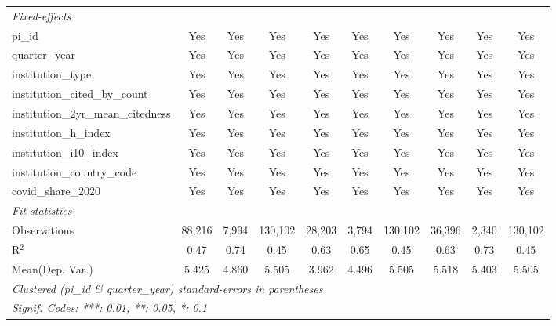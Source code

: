 \begin{tabular}{lccccccccc}
   \midrule
   \emph{Fixed-effects}\\
   pi\_id                                                      & Yes            & Yes             & Yes            & Yes           & Yes           & Yes            & Yes           & Yes             & Yes\\  
   quarter\_year                                               & Yes            & Yes             & Yes            & Yes           & Yes           & Yes            & Yes           & Yes             & Yes\\  
   institution\_type                                           & Yes            & Yes             & Yes            & Yes           & Yes           & Yes            & Yes           & Yes             & Yes\\  
   institution\_cited\_by\_count                               & Yes            & Yes             & Yes            & Yes           & Yes           & Yes            & Yes           & Yes             & Yes\\  
   institution\_2yr\_mean\_citedness                           & Yes            & Yes             & Yes            & Yes           & Yes           & Yes            & Yes           & Yes             & Yes\\  
   institution\_h\_index                                       & Yes            & Yes             & Yes            & Yes           & Yes           & Yes            & Yes           & Yes             & Yes\\  
   institution\_i10\_index                                     & Yes            & Yes             & Yes            & Yes           & Yes           & Yes            & Yes           & Yes             & Yes\\  
   institution\_country\_code                                  & Yes            & Yes             & Yes            & Yes           & Yes           & Yes            & Yes           & Yes             & Yes\\  
   covid\_share\_2020                                          & Yes            & Yes             & Yes            & Yes           & Yes           & Yes            & Yes           & Yes             & Yes\\  
   \midrule
   \emph{Fit statistics}\\
   Observations                                                & 88,216         & 7,994           & 130,102        & 28,203        & 3,794         & 130,102        & 36,396        & 2,340           & 130,102\\  
   R$^2$                                                       & 0.47           & 0.74            & 0.45           & 0.63          & 0.65          & 0.45           & 0.63          & 0.73            & 0.45\\  
Mean(Dep. Var.) & 5.425 & 4.860 & 5.505 & 3.962 & 4.496 & 5.505 & 5.518 & 5.403 & 5.505 \\
   \midrule \midrule
   \multicolumn{10}{l}{\emph{Clustered (pi\_id \& quarter\_year) standard-errors in parentheses}}\\
   \multicolumn{10}{l}{\emph{Signif. Codes: ***: 0.01, **: 0.05, *: 0.1}}\\
\end{tabular}
\par\endgroup
